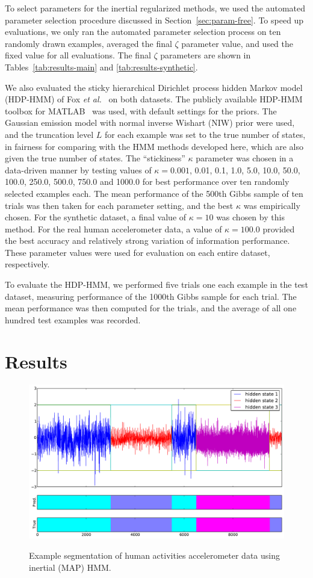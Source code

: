 \documentclass[12pt]{article}
\begin{document}
To select parameters for the inertial regularized methods, we used the automated parameter selection procedure discussed in Section~\ref{sec:param-free}. To speed up evaluations, we only ran the automated parameter selection process on ten randomly drawn examples, averaged the final $\zeta$ parameter value, and used the fixed value for all evaluations. The final $\zeta$ parameters are shown in Tables~\ref{tab:results-main} and \ref{tab:results-synthetic}.

We also evaluated the sticky hierarchical Dirichlet process hidden Markov model (HDP-HMM) of Fox \emph{et al.}~\cite{fox2011sticky} on both datasets. The publicly available HDP-HMM toolbox for MATLAB~\cite{HDP-HMM-TOOLKIT} was used, with default settings for the priors. The Gaussian emission model with normal inverse Wishart (NIW) prior were used, and the truncation level $L$ for each example was set to the true number of states, in fairness for comparing with the HMM methods developed here, which are also given the true number of states. The ``stickiness'' $\kappa$ parameter was chosen in a data-driven manner by testing values of $\kappa=0.001$, 0.01, 0.1, 1.0, 5.0, 10.0, 50.0, 100.0, 250.0, 500.0, 750.0 and 1000.0 for best performance over ten randomly selected examples each. The mean performance of the 500th Gibbs sample of ten trials was then taken for each parameter setting, and the best $\kappa$ was empirically chosen. For the synthetic dataset, a final value of $\kappa=10$ was chosen by this method. For the real human accelerometer data, a value of $\kappa=100.0$ provided the best accuracy and relatively strong variation of information performance. These parameter values were used for evaluation on each entire dataset, respectively.

To evaluate the HDP-HMM, we performed five trials one each example in the test dataset, measuring performance of the 1000th Gibbs sample for each trial. The mean performance was then computed for the trials, and the average of all one hundred test examples was recorded.

\section{Results}\label{sec:Results}

\begin{figure}[htbp]
    \caption{Example segmentation of human activities accelerometer data using inertial (MAP) HMM.}
  \centering
    \includegraphics[width=0.8\linewidth]{images/MAP_PARAM_FREE_results_hard_activity_long_1,97_3_states.pdf}
    \label{fig:real-results-MAP}
\end{figure}
\end{document}
